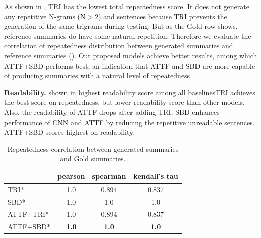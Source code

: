 As shown in , TRI has the lowest total repeatedness score.
It does not generate any repetitive N-grams (N$>$2) and sentences 
because TRI prevents the generation of the same trigrams during testing.
But as the Gold row shows, reference summaries do have some natural repetition.
Therefore we evaluate the correlation of repeatedness distribution between
generated summaries and reference summaries ().
Our proposed models achieve better results, among which ATTF+SBD performs best, an indication that ATTF and SBD are more capable of producing summaries with a natural level of repeatedness.

\textbf{Readability.}
\DIFdelbegin {}\DIFdelend \DIFaddbegin {}\DIFaddend shown in \DIFdelbegin {}\DIFdelend \DIFaddbegin {}\DIFaddend highest readability score among all baselines\DIFdelbegin {}\DIFdelend \DIFaddbegin {}\DIFaddend TRI achieves the best score on repeatedness, 
but lower readability score than other models.
Also, the readability of ATTF drops after adding TRI.
SBD enhances performance of CNN and ATTF by reducing the repetitive unreadable sentences. 
ATTF+SBD scores highest on readability.

\begin{table}[th!]
	\centering
	\small
	\begin{tabular}{|l|c|c|c|}
		\hline
		     & pearson  & spearman & kendall's tau \\
		\hline
		TRI* & 1.0 & 0.894 & 0.837  \\
		SBD* & 1.0 & 1.0 & 1.0 \\
		ATTF+TRI* & 1.0 & 0.894 & 0.837 \\
		ATTF+SBD* & \bf 1.0 & \bf 1.0 & \bf 1.0 \\
		\hline
	\end{tabular}
    \caption{Repeatedness correlation between generated summaries and Gold summaries.}
	\label{tab:eval_repcor}
\end{table}

